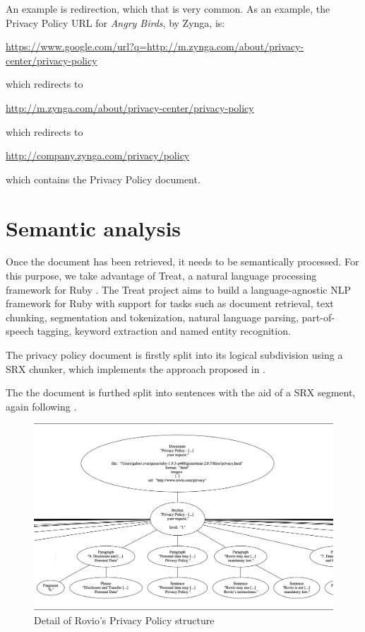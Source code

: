 An example is redirection, which that is very common. As an example, the Privacy Policy URL for \emph{Angry Birds}, by Zynga, is:

\url{https://www.google.com/url?q=http://m.zynga.com/about/privacy-center/privacy-policy}

which redirects to

\url{http://m.zynga.com/about/privacy-center/privacy-policy}

which redirects to

\url{http://company.zynga.com/privacy/policy}

which contains the Privacy Policy document.


\section{Semantic analysis}
Once the document has been retrieved, it needs to be semantically processed. For this purpose, we take advantage of Treat, a natural language processing framework for Ruby \cite{treat}. The Treat project aims to build a language-agnostic NLP framework for Ruby with support for tasks such as document retrieval, text chunking, segmentation and tokenization, natural language parsing, part-of-speech tagging, keyword extraction and named entity recognition.

The privacy policy document is firstly split into its logical subdivision using a SRX chunker, which implements the approach proposed in \cite{Milkowski:2009:USS:1987717.1987736}.

The the document is furthed split into sentences with the aid of a SRX segment, again following \cite{Milkowski:2009:USS:1987717.1987736}.


\begin{figure}[tb]
\centering
     \includegraphics[width=\textwidth]{images/rovio-structure}
      \caption{Detail of Rovio's Privacy Policy structure}
      \label{fig:rovio-structure}
\end{figure}

